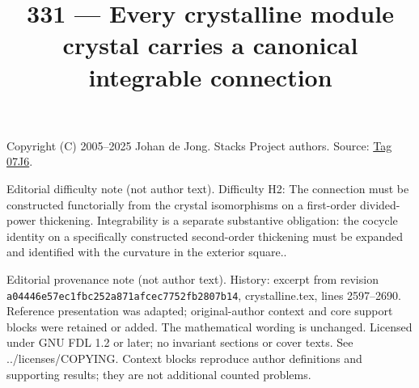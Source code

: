 \documentclass{amsart}
\theoremstyle{plain}
\theoremstyle{definition}
\theoremstyle{remark}
\numberwithin{equation}{subsection}
\begin{document}
\title[Stacks Project, Tag 07J6]{331 --- Every crystalline module crystal carries a canonical integrable connection}
\maketitle
\noindent Copyright (C) 2005--2025 Johan de Jong. Stacks Project authors. Source: \href{https://stacks.math.columbia.edu/tag/07J6}{Tag 07J6}.

\noindent Editorial difficulty note (not author text). Difficulty H2: The connection must be constructed functorially from the crystal isomorphisms on a first-order divided-power thickening. Integrability is a separate substantive obligation: the cocycle identity on a specifically constructed second-order thickening must be expanded and identified with the curvature in the exterior square..

\noindent Editorial provenance note (not author text). History: excerpt from revision \texttt{a0444\allowbreak 6e57e\allowbreak c1fbc\allowbreak 252a8\allowbreak 71afc\allowbreak ec775\allowbreak 2fb28\allowbreak 07b14}, crystalline.tex, lines 2597--2690. Reference presentation was adapted; original-author context and core support blocks were retained or added. The mathematical wording is unchanged. Licensed under GNU FDL 1.2 or later; no invariant sections or cover texts. See ../licenses/COPYING. Context blocks reproduce author definitions and supporting results; they are not additional counted problems.
\end{document}
